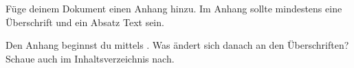 \begin{uebung}
\item Füge deinem Dokument einen Anhang hinzu. Im Anhang sollte mindestens
    eine Überschrift und ein Absatz Text sein.
    \begin{hinweis}
        Den Anhang beginnst du mittels . Was ändert sich
        danach an den Überschriften? Schaue auch im Inhaltsverzeichnis nach.
    \end{hinweis}\label{markup:last}

\end{uebung}